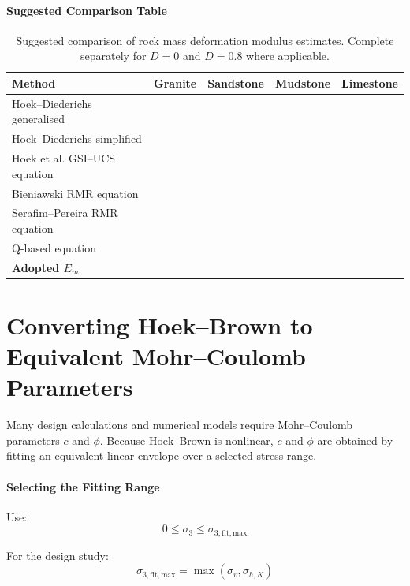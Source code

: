 \paragraph{Suggested Comparison Table}

\begin{table}[H]
\centering
\small
\begin{tabularx}{\textwidth}{l c c c c}
\toprule
\textbf{Method} & \textbf{Granite} & \textbf{Sandstone} & \textbf{Mudstone} & \textbf{Limestone} \\
\midrule
Hoek--Diederichs generalised & & & & \\
Hoek--Diederichs simplified & & & & \\
Hoek et al. GSI--UCS equation & & & & \\
Bieniawski RMR equation & & & & \\
Serafim--Pereira RMR equation & & & & \\
Q-based equation & & & & \\
\midrule
\textbf{Adopted \(E_m\)} & & & & \\
\bottomrule
\end{tabularx}
\caption{Suggested comparison of rock mass deformation modulus estimates. Complete separately for \(D=0\) and \(D=0.8\) where applicable.}
\label{tab:modulus_comparison}
\end{table}
\section{Converting Hoek--Brown to Equivalent Mohr--Coulomb Parameters}

Many design calculations and numerical models require Mohr--Coulomb parameters
\(c\) and \(\phi\). Because Hoek--Brown is nonlinear, \(c\) and \(\phi\) are obtained by
fitting an equivalent linear envelope over a selected stress range.

\paragraph{Selecting the Fitting Range}

Use:
\[
0 \leq \sigma_3 \leq \sigma_{3,\mathrm{fit,max}}
\]

For the design study:
\[
\sigma_{3,\mathrm{fit,max}}=\max(\sigma_v,\sigma_{h,K})
\]

